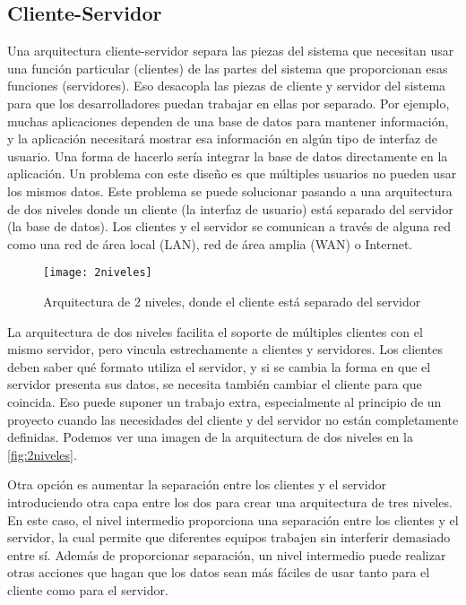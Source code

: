\subsection{Cliente-Servidor}
Una arquitectura cliente-servidor separa las piezas del sistema que necesitan usar una función particular (clientes) de las partes del sistema que proporcionan esas funciones (servidores). Eso desacopla las piezas de cliente y servidor del sistema para que los desarrolladores puedan trabajar en ellas por separado.
Por ejemplo, muchas aplicaciones dependen de una base de datos para mantener información, y la aplicación necesitará mostrar esa información en algún tipo de interfaz de usuario. Una forma de hacerlo sería integrar la base de datos directamente en la aplicación.
Un problema con este diseño es que múltiples usuarios no pueden usar los mismos datos. Este problema se puede solucionar pasando a una arquitectura de dos niveles donde un cliente (la interfaz de usuario) está separado del servidor (la base de datos). Los clientes y el servidor se comunican a través de alguna red como una red de área local (LAN), red de área amplia (WAN) o Internet.
\begin{figure}[h!]
	\centering
	\texttt{[image: 2niveles]}
	\caption{Arquitectura de $2$ niveles, donde el cliente está separado del servidor}
	\label{fig:2niveles}
\end{figure}
La arquitectura de dos niveles facilita el soporte de múltiples clientes con el mismo servidor, pero vincula estrechamente a clientes y servidores. Los clientes deben saber qué formato utiliza el servidor, y si se cambia la forma en que el servidor presenta sus datos, se necesita también cambiar el cliente para que coincida. Eso puede suponer un trabajo extra, especialmente al principio de un proyecto cuando las necesidades del cliente y del servidor no están completamente definidas. Podemos ver una imagen de la arquitectura de dos niveles en la \autoref{fig:2niveles}.

Otra opción es aumentar la separación entre los clientes y el servidor introduciendo otra capa entre los dos para crear una arquitectura de tres niveles.
En este caso, el nivel intermedio proporciona una separación entre los clientes y el servidor, la cual permite que diferentes equipos trabajen sin interferir demasiado entre sí.
Además de proporcionar separación, un nivel intermedio puede realizar otras acciones que hagan que los datos sean más fáciles de usar tanto para el cliente como para el servidor.

